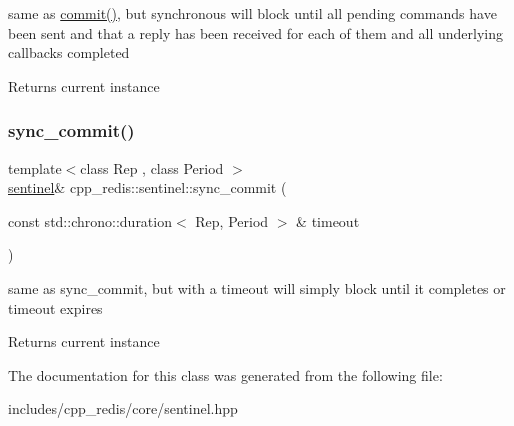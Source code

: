 same as \mbox{\hyperlink{classcpp__redis_1_1sentinel_ad4f85d486499f82225b244f85091b31e}{commit()}}, but synchronous will block until all pending commands have been sent and that a reply has been received for each of them and all underlying callbacks completed

\begin{DoxyReturn}{Returns}
current instance 
\end{DoxyReturn}
\mbox{\label{classcpp__redis_1_1sentinel_afbaa0b80266f70ad98c0bf8f28c533ab}} 
\subsubsection{\texorpdfstring{sync\+\_\+commit()}{sync\_commit()}\hspace{0.1cm}{\footnotesize\ttfamily [2/2]}}
{\footnotesize\ttfamily template$<$class Rep , class Period $>$ \\
\mbox{\hyperlink{classcpp__redis_1_1sentinel}{sentinel}}\& cpp\+\_\+redis\+::sentinel\+::sync\+\_\+commit (\begin{DoxyParamCaption}\item[{const std\+::chrono\+::duration$<$ Rep, Period $>$ \&}]{timeout }\end{DoxyParamCaption})\hspace{0.3cm}{\ttfamily [inline]}}

same as sync\+\_\+commit, but with a timeout will simply block until it completes or timeout expires

\begin{DoxyReturn}{Returns}
current instance 
\end{DoxyReturn}


The documentation for this class was generated from the following file\+:\begin{DoxyCompactItemize}
\item 
includes/cpp\+\_\+redis/core/sentinel.\+hpp\end{DoxyCompactItemize}

